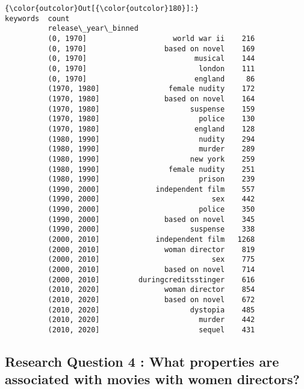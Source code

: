 \documentclass[11pt]{article}
\begin{document}
\begin{Verbatim}[commandchars=\\\{\}]
{\color{outcolor}Out[{\color{outcolor}180}]:}                                  keywords  count
          release\_year\_binned                             
          (0, 1970]                    world war ii    216
          (0, 1970]                  based on novel    169
          (0, 1970]                         musical    144
          (0, 1970]                          london    111
          (0, 1970]                         england     86
          (1970, 1980]                female nudity    172
          (1970, 1980]               based on novel    164
          (1970, 1980]                     suspense    159
          (1970, 1980]                       police    130
          (1970, 1980]                      england    128
          (1980, 1990]                       nudity    294
          (1980, 1990]                       murder    289
          (1980, 1990]                     new york    259
          (1980, 1990]                female nudity    251
          (1980, 1990]                       prison    239
          (1990, 2000]             independent film    557
          (1990, 2000]                          sex    442
          (1990, 2000]                       police    350
          (1990, 2000]               based on novel    345
          (1990, 2000]                     suspense    338
          (2000, 2010]             independent film   1268
          (2000, 2010]               woman director    819
          (2000, 2010]                          sex    775
          (2000, 2010]               based on novel    714
          (2000, 2010]         duringcreditsstinger    616
          (2010, 2020]               woman director    854
          (2010, 2020]               based on novel    672
          (2010, 2020]                     dystopia    485
          (2010, 2020]                       murder    442
          (2010, 2020]                       sequel    431
\end{Verbatim}
            
    \hypertarget{research-question-4-what-properties-are-associated-with-movies-with-women-directors}{%
\subsection{Research Question 4 : What properties are associated with
movies with women
directors?}\label{research-question-4-what-properties-are-associated-with-movies-with-women-directors}}
\end{document}
